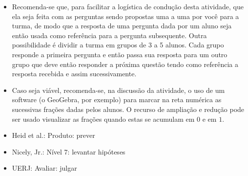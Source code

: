 \begin{multicols}{2}

\begin{itemize} %
    \item       Recomenda-se que, para facilitar a logística de condução desta
atividade, que ela seja feita com as perguntas sendo propostas uma a uma por
você para a turma, de modo que a resposta de uma pergunta dada por um aluno seja
então usada como referência para a pergunta subsequente. Outra possibilidade é
dividir a turma em grupos de 3 a 5 alunos. Cada grupo responde a primeira
pergunta e então passa sua resposta para um outro grupo que deve então responder
a próxima questão tendo como referência a resposta recebida e assim
sucessivamente.
    \item       Caso seja viável, recomenda-se, na discussão da atividade, o uso
de um software (o GeoGebra, por exemplo) para marcar na reta numérica as
sucessivas frações dadas pelos alunos. O recurso de ampliação e redução pode ser
usado visualizar as frações quando estas se acumulam em       $0$       e em
  $1$.
\end{itemize} %


   \vspace{.1cm}

 \vspace{.1cm}

\begin{itemize} %
    \item       Heid et al.: Produto: prever
    \item       Nicely, Jr.: Nível 7: levantar hipóteses
    \item       UERJ: Avaliar: julgar
\end{itemize} %


\end{multicols}
